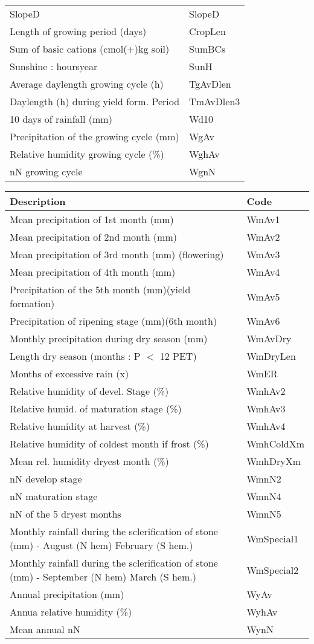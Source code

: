 \documentclass[11pt,fleqn]{article}\usepackage[]{graphicx}\usepackage[]{color}
\begin{document}
\begin{table}[!h]
\begin{tabular}{p{}|l}
SlopeD	&SlopeD\\
Length of growing period (days)	&CropLen\\
Sum of basic cations (cmol(+)\/kg soil)	&SumBCs\\
Sunshine : hours\/year	&SunH\\
Average daylength growing cycle (h)	&TgAvDlen\\
Daylength (h) during yield form. Period	&TmAvDlen3\\
10 days of rainfall (mm)	&Wd10\\
Precipitation of the growing cycle (mm)	&WgAv\\
Relative humidity growing cycle (\%)	&WghAv\\
n\/N growing cycle	&WgnN\\
\bottomrule
\end{tabular}
\end{table}
\begin{table}[!h]
\begin{tabular}{p{}|l}
\toprule
\textbf{Description}&\textbf{Code}\\\hline
Mean precipitation of 1st month (mm)	&WmAv1\\
Mean precipitation of 2nd month (mm)	&WmAv2\\
Mean precipitation of 3rd month (mm) (flowering)	&WmAv3\\
Mean precipitation of 4th month (mm)	&WmAv4\\
Precipitation of the 5th month (mm)(yield formation)	&WmAv5\\
Precipitation of ripening stage (mm)(6th month)	&WmAv6\\
Monthly precipitation during dry season (mm)	&WmAvDry\\
Length dry season (months : P $<$ 1\/2 PET)	&WmDryLen\\
Months of excessive rain (x)	&WmER\\
Relative humidity of devel. Stage (\%)	&WmhAv2\\
Relative humid. of maturation stage (\%)	&WmhAv3\\
Relative humidity at harvest (\%)	&WmhAv4\\
Relative humidity of coldest month if frost (\%)	&WmhColdXm\\
Mean rel. humidity dryest month (\%)	&WmhDryXm\\
n\/N develop stage	&WmnN2\\
n\/N maturation stage	&WmnN4\\
n\/N of  the 5 dryest months	&WmnN5\\
Monthly rainfall during the sclerification of stone  (mm) - August (N hem) February (S hem.)	&WmSpecial1\\
Monthly rainfall during the sclerification of stone  (mm) - September (N hem) March (S hem.)	&WmSpecial2\\
Annual precipitation (mm)	&WyAv\\
Annua relative humidity (\%)	&WyhAv\\
Mean annual n\/N	&WynN\\
\bottomrule
\end{tabular}
\end{table}
\end{document}
